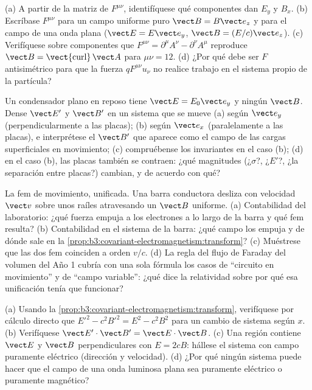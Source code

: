 \begin{exercise}[$\star$]\label{exo:b3:covariant-electromagnetism:3}
(a) A partir de la matriz de $F^{\mu\nu}$, identifíquese qué componentes dan
$E_y$ y $B_x$. (b) Escríbase $F^{\mu\nu}$ para un campo uniforme puro
$\vect B = B\vect e_z$ y para el campo de una onda plana
($\vect E = E\vect e_y$, $\vect B = (E/c)\vect e_z$). (c) Verifíquese sobre
componentes que $F^{\mu\nu} = \partial^\mu A^\nu - \partial^\nu
A^\mu$ reproduce $\vect B = \operatorname{\vect{curl}}\vect A$ para
$\mu\nu = 12$. (d) ¿Por qué debe ser $F$ antisimétrico para que la fuerza
$qF^{\mu\nu}u_\nu$ no realice trabajo en el sistema propio de la partícula?
\end{exercise}

\begin{exercise}[$\star$]\label{exo:b3:covariant-electromagnetism:4}
Un condensador plano en reposo tiene $\vect E = E_0\vect e_y$ y ningún
$\vect B$. Dense $\vect E'$ y $\vect B'$ en un sistema que se mueve (a) según
$\vect e_y$ (perpendicularmente a las placas); (b) según $\vect
e_x$ (paralelamente a las placas), e interprétese el $\vect B'$ que aparece
como el campo de las cargas superficiales en movimiento; (c) compruébense los
invariantes en el caso (b); (d) en el caso (b), las placas también se
contraen: ¿qué magnitudes (¿$\sigma$?, ¿$E'$?, ¿la separación entre placas?)
cambian, y de acuerdo con qué?
\end{exercise}

\begin{exercise}[$\star\star$]\label{exo:b3:covariant-electromagnetism:5}
La fem de movimiento, unificada. Una barra conductora desliza con velocidad
$\vect v$ sobre unos raíles atravesando un $\vect B$ uniforme. (a)
Contabilidad del laboratorio: ¿qué fuerza empuja a los electrones a lo largo
de la barra y qué fem resulta? (b) Contabilidad en el sistema de la barra:
¿qué campo los empuja y de dónde sale en la
\cref{prop:b3:covariant-electromagnetism:transform}? (c) Muéstrese que las
dos fem coinciden a orden $v/c$. (d) La regla del flujo de Faraday del
volumen del Año 1 cubría con una sola fórmula los casos de ``circuito en
movimiento'' y de ``campo variable'': ¿qué dice la relatividad sobre por qué
esa unificación tenía que funcionar?
\end{exercise}

\begin{exercise}[$\star\star$]\label{exo:b3:covariant-electromagnetism:6}
(a) Usando la \cref{prop:b3:covariant-electromagnetism:transform}, verifíquese
por cálculo directo que $E'^2 - c^2B'^2 = E^2 - c^2B^2$ para un
cambio de sistema según $x$. (b) Verifíquese $\vect E'\cdot\vect B' = \vect
E\cdot\vect B$. (c) Una región contiene $\vect E$ y $\vect B$
perpendiculares con $E = 2cB$: hállese el sistema con campo puramente
eléctrico (dirección y velocidad). (d) ¿Por qué ningún sistema puede hacer
que el campo de una onda luminosa plana sea puramente eléctrico o puramente
magnético?
\end{exercise}

